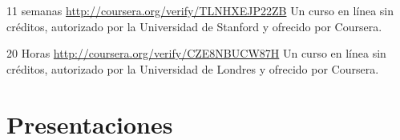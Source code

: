 \documentclass[11pt,a4paper,sans]{moderncv} %
\begin{document}
	      {11 semanas}
	      {\url{http://coursera.org/verify/TLNHXEJP22ZB}}{}
	      {Un curso en línea sin créditos, autorizado por la Universidad de Stanford y ofrecido por Coursera.}

	      {20 Horas}
	      {\url{http://coursera.org/verify/CZE8NBUCW87H}}{}
	      {Un curso en línea sin créditos, autorizado por la Universidad de Londres y ofrecido por Coursera.}












\section{Presentaciones}
\end{document}

